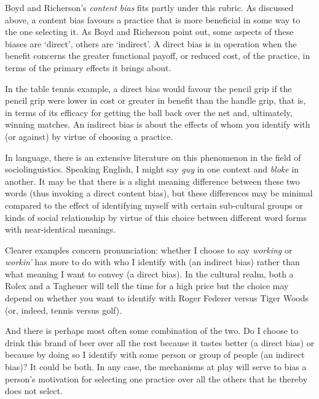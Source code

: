 Boyd and Richerson's \textit{content bias} fits partly under this 
rubric. As discussed above, a content bias favours a practice that is 
more beneficial in some way to the one selecting it. As Boyd and 
Richerson point out, some aspects of these biases are \textquoteleft direct', others 
are \textquoteleft indirect'. A direct bias is in operation when the benefit concerns 
the greater functional payoff, or reduced cost, of the practice, in 
terms of the primary effects it brings about. 



In the table tennis example, a direct bias would favour the pencil grip 
if the pencil grip were lower in cost or greater in benefit than the 
handle grip, that is, in terms of its efficacy for getting the ball back 
over the net and, ultimately, winning matches. An indirect bias is about 
the effects of whom you identify with (or against) by virtue of choosing 
a practice. 



In language, there is an extensive literature on this phenomenon in the 
field of sociolinguistics. Speaking English, I might say \textit{guy} 
in one context and \textit{bloke} in another. It may be that there is 
a slight meaning difference between these two words (thus invoking a 
direct content bias), but these differences may be minimal compared to 
the effect of identifying myself with certain sub-cultural groups or 
kinds of social relationship by virtue of this choice between different 
word forms with near-identical meanings. 



Clearer examples concern pronunciation: whether I choose to say \textit{
working} or \textit{workin'} has more to do with who I identify with 
(an indirect bias) rather than what meaning I want to convey (a direct 
bias). In the cultural realm, both a Rolex and a Tagheuer will tell the 
time for a high price but the choice may depend on whether you want to 
identify with Roger Federer versus Tiger Woods (or, indeed, tennis 
versus golf). 



And there is perhaps most often some combination of the two. Do I choose 
to drink this brand of beer over all the rest because it tastes better 
(a direct bias) or because by doing so I identify with some person or 
group of people (an indirect bias)? It could be both. In any case, the 
mechanisms at play will serve to bias a person's motivation for 
selecting one practice over all the others that he thereby does not 
select. 



